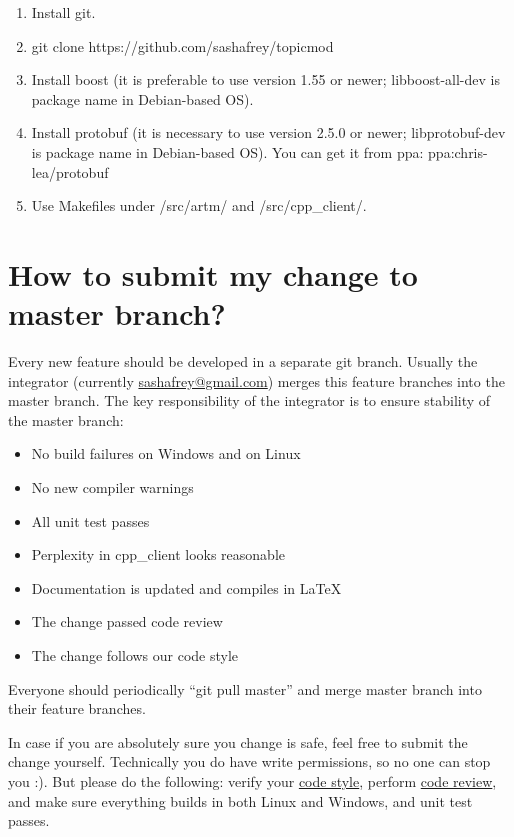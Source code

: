 \documentclass[11pt,a4paper,twoside]{report}
\begin{document}
\begin{enumerate}
    \item Install git.
    \item git clone https://github.com/sashafrey/topicmod
    \item Install boost (it is preferable to use version 1.55 or newer; \hbox{libboost-all-dev} is package name in Debian-based OS).
    \item Install protobuf (it is necessary to use version 2.5.0 or newer; \hbox{libprotobuf-dev} is package name in Debian-based OS). You can get it from ppa: \hbox{ppa:chris-lea/protobuf}
    \item Use Makefiles under /src/artm/ and /src/cpp\_client/.
\end{enumerate}

\section{How to submit my change to master branch?}
\label{label:how_to_submit}
Every new feature should be developed in a separate git branch.
Usually the integrator (currently \href{mailto:sashafrey@gmail.com}{sashafrey@gmail.com})
merges this feature branches into the master branch.
The key responsibility of the integrator is to ensure stability of the master branch:
\begin{itemize}
    \item No build failures on Windows and on Linux
    \item No new compiler warnings
    \item All unit test passes
    \item Perplexity in cpp\_client looks reasonable
    \item Documentation is updated and compiles in LaTeX
    \item The change passed code review
    \item The change follows our code style
\end{itemize}
Everyone should periodically ``git pull master'' and merge master branch
into their feature branches.

In case if you are absolutely sure you change is safe, feel free to submit the change yourself.
Technically you do have write permissions, so no one can stop you :).
But please do the following:
verify your \hyperref[label:code_style]{code style},
perform \hyperref[label:code_review]{code review},
and make sure everything builds in both Linux and Windows, and unit test passes.
\end{document}
